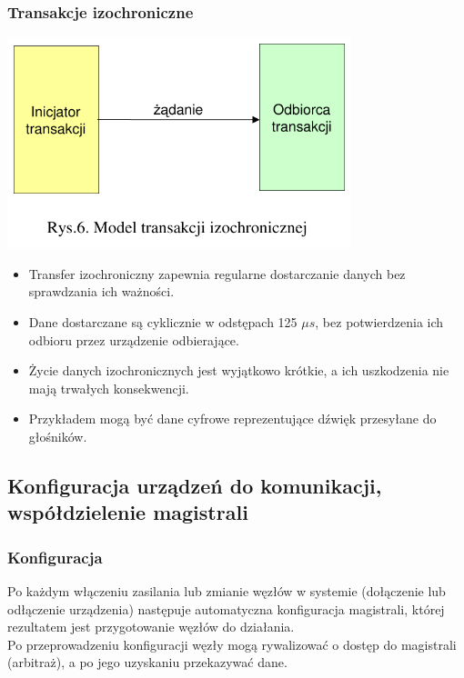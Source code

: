 	\subsubsection{Transakcje izochroniczne}
	\includegraphics[width=10cm]{./wyklady/FIREWIRE_8_1.pdf}\\
	\begin{itemize}
		\item Transfer izochroniczny zapewnia regularne dostarczanie danych bez sprawdzania ich ważności.
		\item Dane dostarczane są cyklicznie w odstępach 125 $\mu{s}$, bez potwierdzenia ich odbioru przez urządzenie odbierające.
		\item Życie danych izochronicznych jest wyjątkowo krótkie, a ich uszkodzenia nie mają trwałych konsekwencji.
		\item Przykładem mogą być dane cyfrowe reprezentujące dźwięk przesyłane do głośników.
	\end{itemize}

\subsection{Konfiguracja urządzeń do komunikacji, współdzielenie magistrali}
\subsubsection{Konfiguracja}
Po każdym włączeniu zasilania lub zmianie węzłów w systemie (dołączenie lub odłączenie urządzenia) następuje automatyczna konfiguracja magistrali, której rezultatem jest przygotowanie węzłów do działania.\\
Po przeprowadzeniu konfiguracji węzły mogą rywalizować o dostęp do magistrali (arbitraż), a po jego uzyskaniu przekazywać dane.
